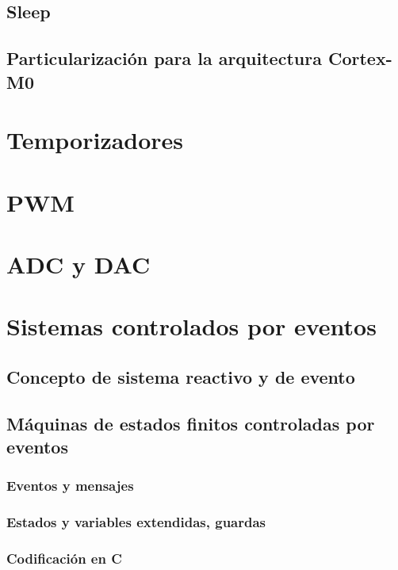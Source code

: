 \documentclass[a4paper]{book}
\begin{document}
\subsection{Sleep}

\subsection{Particularización para la arquitectura Cortex-M0}

\section{Temporizadores}

\section{PWM}

\section{ADC y DAC}

\section{Sistemas controlados por eventos}

\subsection{Concepto de sistema reactivo y de evento}

\subsection{Máquinas de estados finitos controladas por eventos}

\subsubsection{Eventos y mensajes}

\subsubsection{Estados y variables extendidas, guardas}

\subsubsection{Codificación en C}
\end{document}
